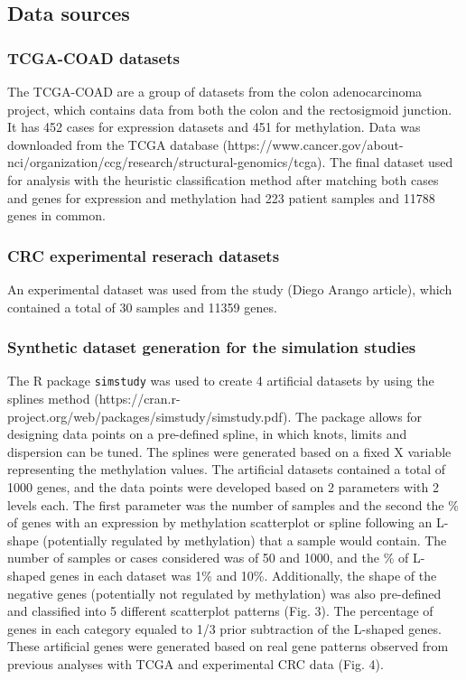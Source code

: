 \documentclass[10pt,letterpaper]{article}
\begin{document}
\hypertarget{data-sources}{%
\subsection{Data sources}\label{data-sources}}

\hypertarget{tcga-coad-datasets}{%
\subsubsection{TCGA-COAD datasets}\label{tcga-coad-datasets}}

The TCGA-COAD are a group of datasets from the colon adenocarcinoma
project, which contains data from both the colon and the rectosigmoid
junction. It has 452 cases for expression datasets and 451 for
methylation. Data was downloaded from the TCGA database
(https://www.cancer.gov/about-nci/organization/ccg/research/structural-genomics/tcga).
The final dataset used for analysis with the heuristic classification
method after matching both cases and genes for expression and
methylation had 223 patient samples and 11788 genes in common.

\hypertarget{crc-experimental-reserach-datasets}{%
\subsubsection{CRC experimental reserach
datasets}\label{crc-experimental-reserach-datasets}}

An experimental dataset was used from the study (Diego Arango article),
which contained a total of 30 samples and 11359 genes.

\hypertarget{synthetic-dataset-generation-for-the-simulation-studies}{%
\subsubsection{Synthetic dataset generation for the simulation
studies}\label{synthetic-dataset-generation-for-the-simulation-studies}}

The R package \texttt{simstudy} was used to create 4 artificial datasets
by using the splines method
(https://cran.r-project.org/web/packages/simstudy/simstudy.pdf). The
package allows for designing data points on a pre-defined spline, in
which knots, limits and dispersion can be tuned. The splines were
generated based on a fixed X variable representing the methylation
values. The artificial datasets contained a total of 1000 genes, and the
data points were developed based on 2 parameters with 2 levels each. The
first parameter was the number of samples and the second the \% of genes
with an expression by methylation scatterplot or spline following an
L-shape (potentially regulated by methylation) that a sample would
contain. The number of samples or cases considered was of 50 and 1000,
and the \% of L-shaped genes in each dataset was 1\% and 10\%.
Additionally, the shape of the negative genes (potentially not regulated
by methylation) was also pre-defined and classified into 5 different
scatterplot patterns (Fig. 3). The percentage of genes in each category
equaled to 1/3 prior subtraction of the L-shaped genes. These artificial
genes were generated based on real gene patterns observed from previous
analyses with TCGA and experimental CRC data (Fig. 4).
\end{document}
